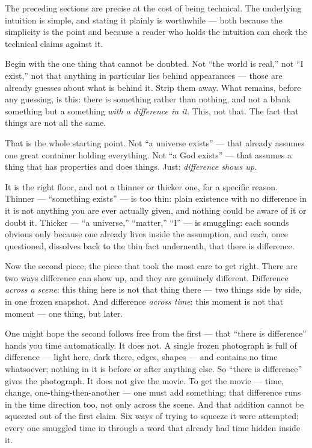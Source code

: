 \documentclass[
]{article}
\begin{document}
The preceding sections are precise at the cost of being technical. The
underlying intuition is simple, and stating it plainly is worthwhile ---
both because the simplicity is the point and because a reader who holds
the intuition can check the technical claims against it.

Begin with the one thing that cannot be doubted. Not ``the world is
real,'' not ``I exist,'' not that anything in particular lies behind
appearances --- those are already guesses about what is behind it. Strip
them away. What remains, before any guessing, is this: there is
something rather than nothing, and not a blank something but a something
\emph{with a difference in it}. This, not that. The fact that things are
not all the same.

That is the whole starting point. Not ``a universe exists'' --- that
already assumes one great container holding everything. Not ``a God
exists'' --- that assumes a thing that has properties and does things.
Just: \emph{difference shows up}.

It is the right floor, and not a thinner or thicker one, for a specific
reason. Thinner --- ``something exists'' --- is too thin: plain
existence with no difference in it is not anything you are ever actually
given, and nothing could be aware of it or doubt it. Thicker --- ``a
universe,'' ``matter,'' ``I'' --- is smuggling: each sounds obvious only
because one already lives inside the assumption, and each, once
questioned, dissolves back to the thin fact underneath, that there is
difference.

Now the second piece, the piece that took the most care to get right.
There are two ways difference can show up, and they are genuinely
different. Difference \emph{across a scene}: this thing here is not that
thing there --- two things side by side, in one frozen snapshot. And
difference \emph{across time}: this moment is not that moment --- one
thing, but later.

One might hope the second follows free from the first --- that ``there
is difference'' hands you time automatically. It does not. A single
frozen photograph is full of difference --- light here, dark there,
edges, shapes --- and contains no time whatsoever; nothing in it is
before or after anything else. So ``there is difference'' gives the
photograph. It does not give the movie. To get the movie --- time,
change, one-thing-then-another --- one must add something: that
difference runs in the time direction too, not only across the scene.
And that addition cannot be squeezed out of the first claim. Six ways of
trying to squeeze it were attempted; every one smuggled time in through
a word that already had time hidden inside it.
\end{document}
